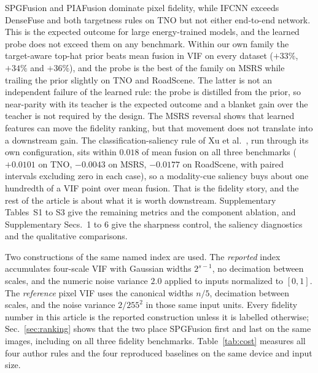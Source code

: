 \documentclass[10pt,a4paper]{article}
\begin{document}
\begin{sloppypar}
SPGFusion and PIAFusion dominate pixel fidelity, while IFCNN exceeds DenseFuse and both
targetness rules on TNO but not either end-to-end network. This is the expected
outcome for large energy-trained models, and the learned probe does not exceed them on
any benchmark. Within our own family the target-aware top-hat prior beats mean fusion in VIF
on every dataset ($+33\%$, $+34\%$ and $+36\%$), and the probe is the best of the
family on MSRS while trailing the prior slightly on TNO and RoadScene. The latter is not
an independent failure of the learned rule: the probe is distilled from the prior, so
near-parity with its teacher is the expected outcome and a blanket gain over the teacher
is not required by the design. The MSRS reversal shows that learned features can move
the fidelity ranking, but that movement does not translate into a downstream gain. The
classification-saliency rule of Xu et al.~\cite{xu2021}, run through its own
configuration, sits within $0.018$ of mean fusion on all three benchmarks
($+0.0101$ on TNO, $-0.0043$ on MSRS, $-0.0177$ on RoadScene, with paired intervals
excluding zero in each case), so a modality-cue saliency buys about one hundredth of a
VIF point over mean fusion. That is the fidelity story, and the rest of the article is
about what it is worth downstream. Supplementary Tables~S1 to S3 give the remaining
metrics and the component ablation, and Supplementary Secs.~1 to 6
give the sharpness control, the saliency diagnostics and the qualitative comparisons.

Two constructions of the same named index are used. The \emph{reported} index
accumulates four-scale VIF with Gaussian widths $2^{s-1}$, no decimation between scales,
and the numeric noise variance $2.0$ applied to inputs normalized to $[0,1]$. The
\emph{reference} pixel VIF uses the canonical widths $n/5$, decimation between scales,
and the noise variance $2/255^2$ in those same input units. Every fidelity number in
this article is the reported construction unless it is labelled otherwise;
Sec.~\ref{sec:ranking} shows that the two place SPGFusion first and last on the same
images, including on all three fidelity benchmarks. Table~\ref{tab:cost} measures all
four author rules and the four reproduced baselines on the same device and input size.

\begin{table}[!t]\centering\footnotesize


\end{table}
\end{sloppypar}
\end{document}
